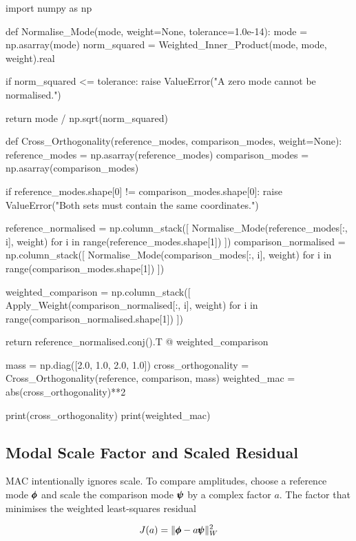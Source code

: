 \begin{python}
import numpy as np


def Normalise_Mode(mode, weight=None, tolerance=1.0e-14):
    mode = np.asarray(mode)
    norm_squared = Weighted_Inner_Product(mode, mode, weight).real

    if norm_squared <= tolerance:
        raise ValueError("A zero mode cannot be normalised.")

    return mode / np.sqrt(norm_squared)


def Cross_Orthogonality(reference_modes, comparison_modes, weight=None):
    reference_modes = np.asarray(reference_modes)
    comparison_modes = np.asarray(comparison_modes)

    if reference_modes.shape[0] != comparison_modes.shape[0]:
        raise ValueError("Both sets must contain the same coordinates.")

    reference_normalised = np.column_stack([
        Normalise_Mode(reference_modes[:, i], weight)
        for i in range(reference_modes.shape[1])
    ])
    comparison_normalised = np.column_stack([
        Normalise_Mode(comparison_modes[:, i], weight)
        for i in range(comparison_modes.shape[1])
    ])

    weighted_comparison = np.column_stack([
        Apply_Weight(comparison_normalised[:, i], weight)
        for i in range(comparison_normalised.shape[1])
    ])

    return reference_normalised.conj().T @ weighted_comparison


mass = np.diag([2.0, 1.0, 2.0, 1.0])
cross_orthogonality = Cross_Orthogonality(reference, comparison, mass)
weighted_mac = abs(cross_orthogonality)**2

print(cross_orthogonality)
print(weighted_mac)
\end{python}

\subsection{Modal Scale Factor and Scaled Residual}

MAC intentionally ignores scale. To compare amplitudes, choose a reference mode
$\pmb{\phi}$ and scale the comparison mode $\pmb{\psi}$ by a complex factor $a$.
The factor that minimises the weighted least-squares residual

\begin{equation}
    J(a)=\| {\pmb{\phi}-a\pmb{\psi}} \|_{W}^{2}
\end{equation}

